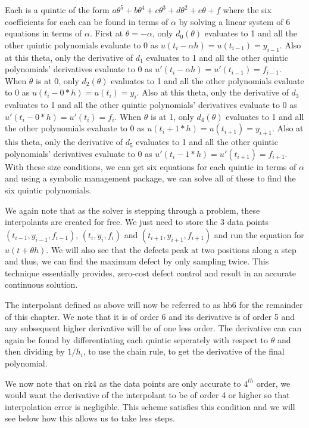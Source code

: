 \documentclass{article}
\begin{document}
Each is a quintic of the form $a\theta^5 + b\theta^4 + c\theta^3 + d\theta^2 + e\theta + f$ where the six coefficients for each can be found in terms of $\alpha$ by solving a linear system of 6 equations in terms of $\alpha$. First at $\theta = -\alpha$, only $d_0(\theta)$ evaluates to 1 and all the other quintic polynomials evaluate to 0 as $u(t_i - \alpha h) = u(t_{i - 1}) = y_{i - 1}$. Also at this theta, only the derivative of $d_1$ evaluates to 1 and all the other quintic polynomials' derivatives evaluate to 0 as $u'(t_i - \alpha h) = u'(t_{i - 1}) = f_{i - 1}$. When $\theta$ is at 0, only $d_2(\theta)$ evaluates to 1 and all the other polynomials evaluate to 0 as $u(t_i - 0*h) = u(t_i) = y_i$. Also at this theta, only the derivative of $d_3$ evaluates to 1 and all the other quintic polynomials' derivatives evaluate to 0 as $u'(t_i - 0*h) = u'(t_i) = f_i$. When $\theta$ is at 1, only $d_4(\theta)$ evaluates to 1 and all the other polynomials evaluate to 0 as $u(t_i + 1*h) = u(t_{i+1}) = y_{i+1}$. Also at this theta, only the derivative of $d_5$ evaluates to 1 and all the other quintic polynomials' derivatives evaluate to 0 as $u'(t_i - 1*h) = u'(t_{i+1}) = f_{i+1}$. With these size conditions, we can get six equations for each quintic in terms of $\alpha$ and using a symbolic management package, we can solve all of these to find the six quintic polynomials.

We again note that as the solver is stepping through a problem, these interpolants are created for free. We just need to store the 3 data points $(t_{i-1}, y_{i - 1}, f_{i - 1})$, $(t_i, y_i, f_i)$ and $(t_{i + 1}, y_{i + 1}, f_{i + 1})$ and run the equation for $u(t + \theta h)$. We will also see that the defects peak at two positions along a step and thus, we can find the maximum defect by only sampling twice. This technique essentially provides, zero-cost defect control and result in an accurate continuous solution.

The interpolant defined as above will now be referred to as hb6 for the remainder of this chapter. We note that it is of order 6 and its derivative is of order 5 and any subsequent higher derivative will be of one less order. The derivative can can again be found by differentiating each quintic seperately with respect to $\theta$ and then dividing by $1/h_i$, to use the chain rule, to get the derivative of the final polynomial.

We now note that on rk4 as the data points are only accurate to $4^{th}$ order, we would want the derivative of the interpolant to be of order 4 or higher so that interpolation error is negligible. This scheme satisfies this condition and we will see below how this allows us to take less steps.
\end{document}
